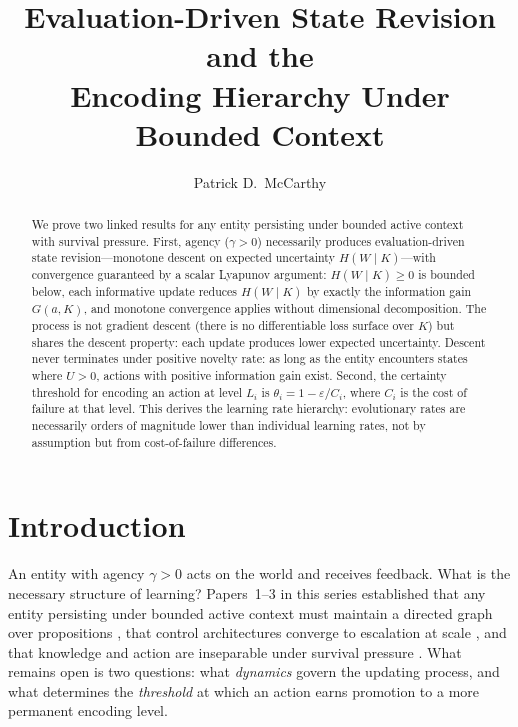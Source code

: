 \documentclass[11pt]{article}
\title{Evaluation-Driven State Revision and the\\Encoding Hierarchy Under Bounded Context}
\author{Patrick D.\ McCarthy}
\date{}
\theoremstyle{definition}
\begin{document}
\maketitle

\begin{abstract}
We prove two linked results for any entity persisting under bounded
active context with survival pressure. First, agency ($\gamma > 0$)
necessarily produces evaluation-driven state revision---monotone
descent on expected uncertainty $H(W \mid K)$---with convergence
guaranteed by a scalar Lyapunov argument: $H(W \mid K) \geq 0$ is
bounded below, each informative update reduces $H(W \mid K)$ by
exactly the information gain $G(a, K)$, and monotone convergence
applies without dimensional decomposition. The process is not gradient
descent (there is no differentiable loss surface over $K$) but shares
the descent property: each update produces lower
expected uncertainty. Descent never terminates under positive novelty
rate: as long as the entity encounters states where $U > 0$, actions
with positive information gain exist. Second, the certainty threshold for encoding an action
at level $L_i$ is $\theta_i = 1 - \varepsilon / C_i$, where $C_i$ is
the cost of failure at that level. This derives the learning rate
hierarchy: evolutionary rates are necessarily orders of magnitude lower
than individual learning rates, not by assumption but from
cost-of-failure differences.
\end{abstract}

\section{Introduction}
\label{sec:intro}

An entity with agency $\gamma > 0$ acts on the world and receives feedback.
What is the necessary structure of learning? Papers~1--3 in this
series established that any entity persisting under bounded active
context must maintain a directed graph over propositions
\cite{McCarthy2026a}, that control architectures converge to escalation at scale
\cite{McCarthy2026b}, and that knowledge and action are inseparable
under survival pressure \cite{McCarthy2026c}. What remains open is two
questions: what \emph{dynamics} govern the updating process, and what
determines the \emph{threshold} at which an action earns promotion to
a more permanent encoding level.
\end{document}
